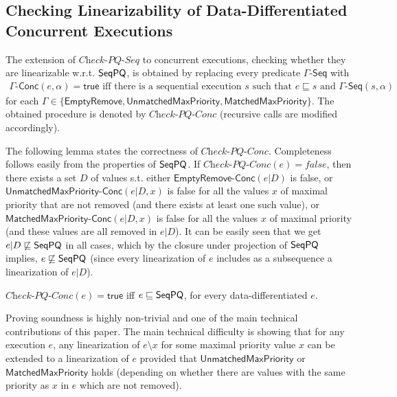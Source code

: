 \documentclass[a4paper,UKenglish]{lipics-v2016}
\begin{document}
\subsection{Checking Linearizability of Data-Differentiated Concurrent Executions}\label{ssec:conc_exec}

The extension of $\textit{Check-PQ-Seq}$ to concurrent executions, checking whether they are linearizable w.r.t. $\mathsf{SeqPQ}$, is obtained by replacing every predicate $\Gamma\mathsf{\text{-}Seq}$ with
\begin{align*}
\Gamma\mathsf{\text{-}Conc}(e,\alpha) = \mathsf{true}\mbox{ iff there is a sequential execution $s$ such that $e\sqsubseteq s$ and $\Gamma\mathsf{\text{-}Seq}(s,\alpha)$}
\end{align*}
for each $\Gamma\in \{\mathsf{EmptyRemove}, \mathsf{UnmatchedMaxPriority}, \mathsf{MatchedMaxPriority}\}$. The obtained procedure is denoted by 
$\textit{Check-PQ-Conc}$ (recursive calls are modified accordingly).


The following lemma states the correctness of $\textit{Check-PQ-Conc}$. Completeness follows easily from the properties of $\mathsf{SeqPQ}$. If $\textit{Check-PQ-Conc}(e) = \textit{false}$, then there exists a set $D$ of values s.t. either  $\mathsf{EmptyRemove\text{-}Conc}(e \vert D)$ is false, or $\mathsf{UnmatchedMaxPriority\text{-}Conc}(e \vert D,x)$ is false for all the values $x$ of maximal priority that are not removed (and there exists at least one such value), or $\mathsf{MatchedMaxPriority\text{-}Conc}(e \vert D,x)$ is false for all the values $x$ of maximal priority (and these values are all removed in $e \vert D$). It can be easily seen that we get $e \vert D\not\sqsubseteq \mathsf{SeqPQ}$ in all cases, which by the closure under projection of $\mathsf{SeqPQ}$ implies, $e \not\sqsubseteq \mathsf{SeqPQ}$ (since every linearization of $e$ includes as a subsequence a linearization of $e \vert D$).

\begin{lemma}\label{lemma:con-check-EPQ is correct}
$\textit{Check-PQ-Conc}(e)=\mathsf{true}$ iff $e \sqsubseteq \mathsf{SeqPQ}$, for every data-differentiated $e$.
\end{lemma}


Proving soundness is highly non-trivial and one of the main technical contributions of this paper. 
The main technical difficulty is showing that for any execution $e$, any linearization of $e\setminus x$ for some maximal priority value $x$ can be extended to a linearization of $e$ provided that $\mathsf{UnmatchedMaxPriority}$ or $\mathsf{MatchedMaxPriority}$ holds (depending on whether there are values with the same priority as $x$ in $e$ which are not removed).
\end{document}
